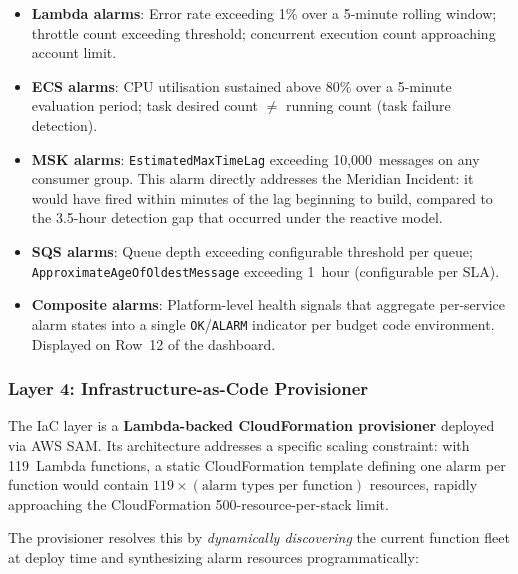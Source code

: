 \begin{itemize}
    \item \textbf{Lambda alarms}: Error rate exceeding 1\% over a
          5-minute rolling window; throttle count exceeding threshold;
          concurrent execution count approaching account limit.

    \item \textbf{ECS alarms}: CPU utilisation sustained above 80\%
          over a 5-minute evaluation period; task desired count $\neq$
          running count (task failure detection).

    \item \textbf{MSK alarms}: \texttt{EstimatedMaxTimeLag} exceeding
          10,000~messages on any consumer group. This alarm directly
          addresses the Meridian Incident: it would have fired within
          minutes of the lag beginning to build, compared to the 3.5-hour
          detection gap that occurred under the reactive model.

    \item \textbf{SQS alarms}: Queue depth exceeding configurable
          threshold per queue; \texttt{ApproximateAgeOfOldestMessage}
          exceeding 1~hour (configurable per SLA).

    \item \textbf{Composite alarms}: Platform-level health signals that
          aggregate per-service alarm states into a single
          \texttt{OK}/\texttt{ALARM} indicator per budget code
          environment. Displayed on Row~12 of the dashboard.
\end{itemize}

\subsubsection{Layer 4: Infrastructure-as-Code Provisioner}

The IaC layer is a \textbf{Lambda-backed CloudFormation provisioner}
deployed via AWS SAM. Its architecture addresses a specific scaling
constraint: with 119~Lambda functions, a static CloudFormation template
defining one alarm per function would contain $119 \times (\text{alarm
types per function})$ resources, rapidly approaching the CloudFormation
500-resource-per-stack limit.

The provisioner resolves this by \emph{dynamically discovering} the
current function fleet at deploy time and synthesizing alarm resources
programmatically:

